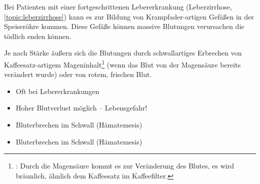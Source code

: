{Bei Patienten mit einer fortgeschrittenen Lebererkrankung
(Leberzirrhose, \ref{topic:leberzirrhose}) kann es zur
Bildung von Krampfader-artigen Gefäßen in der Speiseröhre
kommen. Diese Gefäße können massive Blutungen verursachen
die tödlich enden können. 

Je nach Stärke  äußern sich die Blutungen durch
schwallartiges Erbrechen von Kaffeesatz-artigem
Mageninhalt\footnote{:
Durch die Magensäure kommt es zur Veränderung des Blutes,
es wird bräunlich, ähnlich dem Kaffeesatz im Kaffeefilter.}
(wenn das Blut von der Magensäure bereits verändert wurde) oder von rotem, frischen Blut.
}
{
\begin{itemize}
    \item Oft bei Lebererkrankungen
    \item Hoher Blutverlust möglich -- Lebensgefahr!
\end{itemize}
}{}{}{}

{
\begin{itemize}
  \item Bluterbrechen im Schwall (Hämatemesis)
\end{itemize}
}{
\begin{itemize}
  \item Bluterbrechen im Schwall (Hämatemesis)
\end{itemize}
}{}{}{}










